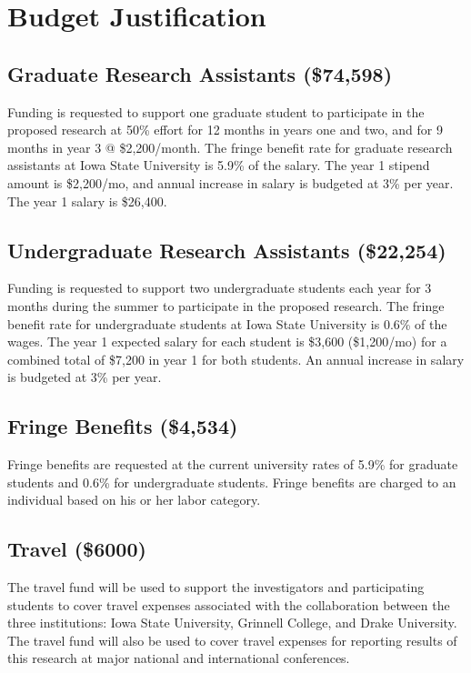 \documentclass[12pt,letterpaper]{article}
\begin{document}
	\section*{Budget Justification}
	
	
	\subsection*{Graduate Research Assistants (\$74,598)}
	Funding is requested to support one graduate student to participate in the proposed research at 50\% effort for 12 months in years one and two, and for 9 months in year 3 @ \$2,200/month.  
	The fringe benefit rate for graduate research assistants at Iowa State University is 5.9\% of the salary.  The year 1 stipend amount is \$2,200/mo, and annual increase in salary is budgeted at 3\% per year.
	The year 1 salary is \$26,400.
	
	\subsection*{Undergraduate Research Assistants (\$22,254)}
	Funding is requested to support two undergraduate students each year for 3 months during the summer to participate in the proposed research.  The fringe benefit rate for undergraduate students at Iowa State University is 0.6\% of the wages.  The year 1 expected salary for each student is \$3,600 (\$1,200/mo) for a combined total of \$7,200 in year 1 for both students.
	An annual increase in salary is budgeted at 3\% per year.
	
	\subsection*{Fringe Benefits (\$4,534)}
	Fringe benefits are requested at the current university rates of 5.9\% for graduate students and 0.6\% for undergraduate students.  Fringe benefits are charged to an individual based on his or her labor category.
	
	\subsection*{Travel (\$6000)}
	The travel fund will be used to support the investigators and participating students to cover travel expenses associated with the collaboration between the three institutions:  Iowa State University, Grinnell College, and Drake University.  The travel fund will also be used to cover travel expenses for reporting results of this research at major national and international conferences.
	
\end{document}
